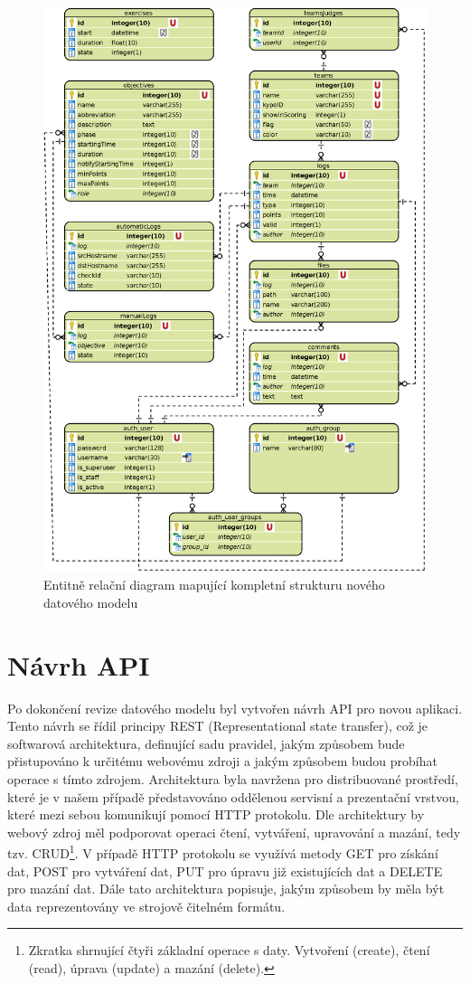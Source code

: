 \documentclass[
  digital, %
  twoside, %
  table,   %
  lof,     %
  lot,     %
]{fithesis3}
\begin{document}
\begin{figure}
    \centering
    \includegraphics[width=12.5cm]{images/ERD-new-app.eps}
    \caption{Entitně relační diagram mapující kompletní strukturu nového datového modelu}
    \label{fig:erdNewApp}
\end{figure}

\section{Návrh API}

Po dokončení revize datového modelu byl vytvořen návrh API pro novou aplikaci. Tento návrh se řídil principy REST (Representational state transfer), což je softwarová architektura, definující sadu pravidel, jakým způsobem bude přistupováno k určitému webovému zdroji a jakým způsobem budou probíhat operace s tímto zdrojem. Architektura byla navržena pro distribuované prostředí, které je v našem případě představováno oddělenou servisní a prezentační vrstvou, které mezi sebou komunikují pomocí HTTP protokolu. Dle architektury by webový zdroj měl podporovat operaci čtení, vytváření, upravování a mazání, tedy tzv. CRUD\footnote{Zkratka shrnující čtyři základní operace s daty. Vytvoření (create), čtení (read), úprava (update) a mazání (delete).}. V případě HTTP protokolu se využívá metody GET pro získání dat, POST pro vytváření dat, PUT pro úpravu již existujících dat a DELETE pro mazání dat. Dále tato architektura popisuje, jakým způsobem by měla být data reprezentovány ve strojově čitelném formátu. \cite{RoyThomasFielding2000ArchitecturalArchitectures}
\end{document}
